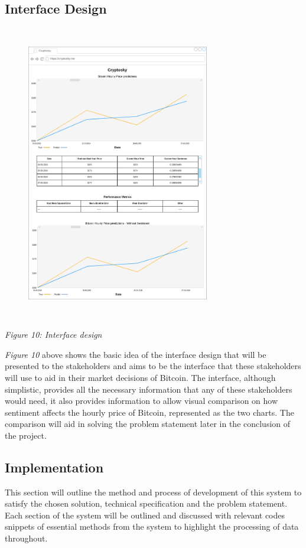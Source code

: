\documentclass[oneside, 12pt]{article}
\begin{document}
		\subsection{Interface Design}
		
		
		\begin{figure}[hbt!]
			\centering
			\includegraphics[width=8cm,height=13cm]{images/interface_design.png}
		\end{figure}
		\begin{center}
			\textit{Figure 10: Interface design}
		\end{center}
		\textit{Figure 10} above shows the basic idea of the interface design that will be presented to the stakeholders and aims to be the interface that these stakeholders will use to aid in their market decisions of Bitcoin. The interface, although simplistic, provides all the necessary information that any of these stakeholders would need, it also provides information to allow visual comparison on how sentiment affects the hourly price of Bitcoin, represented as the two charts. The comparison will aid in solving the problem statement later in the conclusion of the project.
		
	\newpage 
	\begin{center}
		\section{Implementation}\label{implementation}
	\end{center}
		This section will outline the method and process of development of this system to satisfy the chosen solution, technical specification and the problem statement. Each section of the system will be outlined and discussed with relevant codes snippets of essential methods from the system to highlight the processing of data throughout.
		\newline
		
\end{document}
